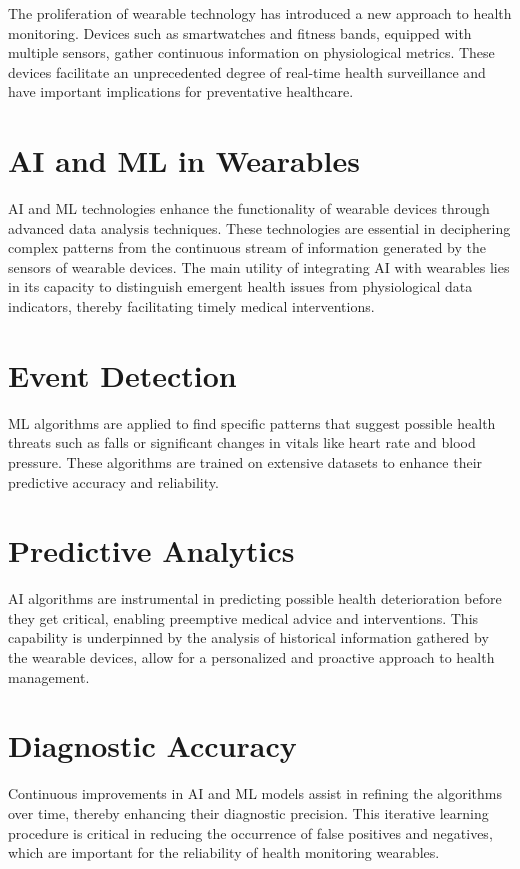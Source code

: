 \noindent{}The proliferation of wearable technology has introduced a new
approach to health monitoring. Devices such as smartwatches and fitness bands,
equipped with multiple sensors, gather continuous information on physiological
metrics. These devices facilitate an unprecedented degree of real-time health
surveillance and have important implications for preventative healthcare.
\cite{huhn2022impact}

\section{AI and ML in Wearables}
AI and ML technologies enhance the functionality of wearable devices through
advanced data analysis techniques. These technologies are essential in
deciphering complex patterns from the continuous stream of information generated
by the sensors of wearable devices. The main utility of integrating AI with
wearables lies in its capacity to distinguish emergent health issues from
physiological data indicators, thereby facilitating timely medical
interventions. \cite{jin2019review}
\newpage

\section{Event Detection}
ML algorithms are applied to find specific patterns that suggest possible health
threats such as falls or significant changes in vitals like heart rate and blood
pressure. These algorithms are trained on extensive datasets to enhance their
predictive accuracy and reliability. \cite{buddha2023future}

\section{Predictive Analytics}
AI algorithms are instrumental in predicting possible health deterioration
before they get critical, enabling preemptive medical advice and interventions.
This capability is underpinned by the analysis of historical information
gathered by the wearable devices, allow for a personalized and proactive
approach to health management. \cite{buddha2023future}

\section{Diagnostic Accuracy}
Continuous improvements in AI and ML models assist in refining the algorithms
over time, thereby enhancing their diagnostic precision. This iterative learning
procedure is critical in reducing the occurrence of false positives and
negatives, which are important for the reliability of health monitoring
wearables. \cite{junaid2022recent}

